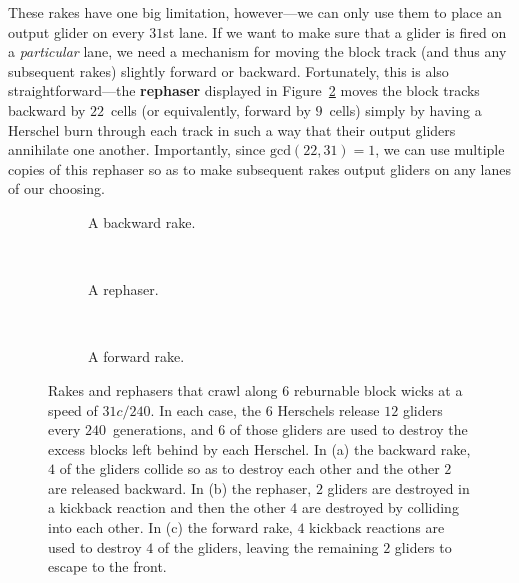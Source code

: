 These rakes have one big limitation, however---we can only use them to place an output glider on every $31$st lane. If we want to make sure that a glider is fired on a \emph{particular} lane, we need a mechanism for moving the block track (and thus any subsequent rakes) slightly forward or backward. Fortunately, this is also straightforward---the \textbf{rephaser} displayed in Figure~\ref{fig:31c_240_rephaser} moves the block tracks backward by $22$~cells (or equivalently, forward by $9$~cells) simply by having a Herschel burn through each track in such a way that their output gliders annihilate one another. Importantly, since $\mathrm{gcd}(22,31) = 1$, we can use multiple copies of this rephaser so as to make subsequent rakes output gliders on any lanes of our choosing.

\begin{figure}[!htb]
	\centering
	\begin{subfigure}{0.28\textwidth}
		\centering
		\caption{A backward rake.}\label{fig:31c_240_back_rake}
	\end{subfigure} \ \ \begin{subfigure}{0.28\textwidth}
		\centering
		\caption{A rephaser.}\label{fig:31c_240_rephaser}
	\end{subfigure} \ \ \begin{subfigure}{0.4\textwidth}
		\centering
		\caption{A forward rake.}\label{fig:31c_240_forward_rake}
	\end{subfigure}
	\caption{Rakes and rephasers that crawl along $6$ reburnable block wicks at a speed of $31c/240$. In each case, the $6$ Herschels release $12$ gliders every $240$~generations, and $6$ of those gliders are used to destroy the excess blocks left behind by each Herschel. In (a) the backward rake, $4$ of the gliders collide so as to destroy each other and the other $2$ are released backward. In (b) the rephaser, $2$ gliders are destroyed in a kickback reaction and then the other $4$ are destroyed by colliding into each other. In (c) the forward rake, $4$ kickback reactions are used to destroy $4$ of the gliders, leaving the remaining $2$ gliders to escape to the front.}\label{fig:31c_240_rakes_and_rephaser}
\end{figure}


